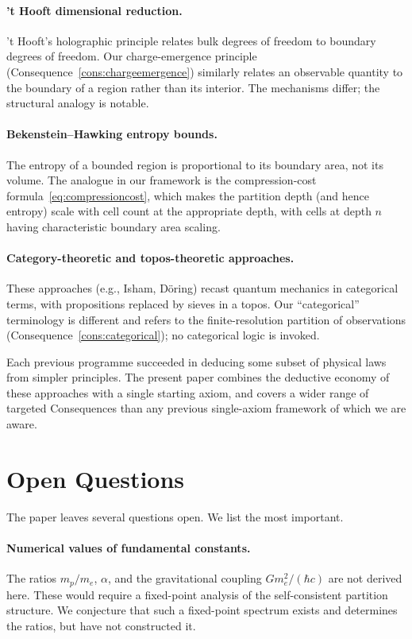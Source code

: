 \documentclass[11pt,twocolumn,a4paper]{article}
\theoremstyle{axiomstyle}
\theoremstyle{conseqstyle}
\theoremstyle{definition}
\theoremstyle{remark}
\begin{document}
\paragraph{'t Hooft dimensional reduction.} 't Hooft's holographic principle relates bulk degrees of freedom to boundary degrees of freedom. Our charge-emergence principle (Consequence~\ref{cons:chargeemergence}) similarly relates an observable quantity to the boundary of a region rather than its interior. The mechanisms differ; the structural analogy is notable.

\paragraph{Bekenstein--Hawking entropy bounds.} The entropy of a bounded region is proportional to its boundary area, not its volume. The analogue in our framework is the compression-cost formula~\eqref{eq:compressioncost}, which makes the partition depth (and hence entropy) scale with cell count at the appropriate depth, with cells at depth $n$ having characteristic boundary area scaling.

\paragraph{Category-theoretic and topos-theoretic approaches.} These approaches (e.g., Isham, D\"oring) recast quantum mechanics in categorical terms, with propositions replaced by sieves in a topos. Our ``categorical'' terminology is different and refers to the finite-resolution partition of observations (Consequence~\ref{cons:categorical}); no categorical logic is invoked.

Each previous programme succeeded in deducing some subset of physical laws from simpler principles. The present paper combines the deductive economy of these approaches with a single starting axiom, and covers a wider range of targeted Consequences than any previous single-axiom framework of which we are aware.

\section{Open Questions}
\label{sec:open}

The paper leaves several questions open. We list the most important.

\paragraph{Numerical values of fundamental constants.} The ratios $m_{p}/m_{e}$, $\alpha$, and the gravitational coupling $G m_{e}^{2}/(\hbar c)$ are not derived here. These would require a fixed-point analysis of the self-consistent partition structure. We conjecture that such a fixed-point spectrum exists and determines the ratios, but have not constructed it.
\end{document}
